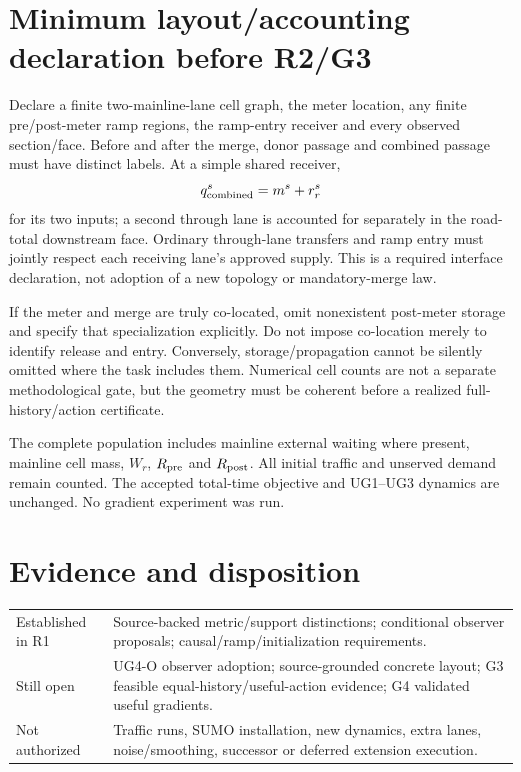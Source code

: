 \documentclass[10pt,a4paper]{article}
\begin{document}
\section{Minimum layout/accounting declaration before R2/G3}
Declare a finite two-mainline-lane cell graph, the meter location, any finite
pre/post-meter ramp regions, the ramp-entry receiver and every observed
section/face. Before and after the merge, donor passage and combined passage
must have distinct labels. At a simple shared receiver,
\begin{equation}
q_{\rm combined}^s=m^s+r_r^s
\end{equation}
for its two inputs; a second through lane is accounted for separately in the
road-total downstream face. Ordinary through-lane transfers and ramp entry
must jointly respect each receiving lane's approved supply. This is a required
interface declaration, not adoption of a new topology or mandatory-merge law.

If the meter and merge are truly co-located, omit nonexistent post-meter storage
and specify that specialization explicitly. Do not impose co-location merely
to identify release and entry. Conversely, storage/propagation cannot be
silently omitted where the task includes them. Numerical cell counts are not
a separate methodological gate, but the geometry must be coherent before
a realized full-history/action certificate.

The complete population includes mainline external waiting where present,
mainline cell mass, $W_r$, $R_{\rm pre}$ and $R_{\rm post}$. All initial traffic
and unserved demand remain counted. The accepted total-time objective and
UG1--UG3 dynamics are unchanged. No gradient experiment was run.

\section{Evidence and disposition}
\begin{tabular}{>{\raggedright\arraybackslash}p{}>{\raggedright\arraybackslash}p{}}
\toprule
Established in R1 & Source-backed metric/support distinctions; conditional
observer proposals; causal/ramp/initialization requirements.\\
Still open & UG4-O observer adoption; source-grounded concrete layout; G3
feasible equal-history/useful-action evidence; G4 validated useful gradients.\\
Not authorized & Traffic runs, SUMO installation, new dynamics, extra lanes,
noise/smoothing, successor or deferred extension execution.\\
\bottomrule
\end{tabular}
\end{document}
